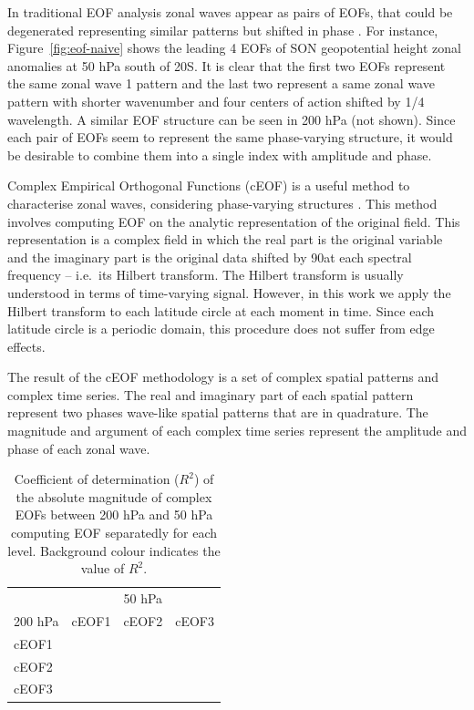 \documentclass[smallextended]{svjour3}       %
\begin{document}
In traditional EOF analysis zonal waves appear as pairs of EOFs, that could be degenerated representing similar patterns but shifted in phase \citep{horel1984}.
For instance, Figure~\ref{fig:eof-naive} shows the leading 4 EOFs of SON geopotential height zonal anomalies at 50 hPa south of 20\degree S.
It is clear that the first two EOFs represent the same zonal wave 1 pattern and the last two represent a same zonal wave pattern with shorter wavenumber and four centers of action shifted by 1/4 wavelength.
A similar EOF structure can be seen in 200 hPa (not shown).
Since each pair of EOFs seem to represent the same phase-varying structure, it would be desirable to combine them into a single index with amplitude and phase.

Complex Empirical Orthogonal Functions (cEOF) is a useful method to characterise zonal waves, considering phase-varying structures \citep{horel1984}.
This method involves computing EOF on the analytic representation of the original field.
This representation is a complex field in which the real part is the original variable and the imaginary part is the original data shifted by 90\degree at each spectral frequency -- i.e.~its Hilbert transform.
The Hilbert transform is usually understood in terms of time-varying signal.
However, in this work we apply the Hilbert transform to each latitude circle at each moment in time.
Since each latitude circle is a periodic domain, this procedure does not suffer from edge effects.

The result of the cEOF methodology is a set of complex spatial patterns and complex time series.
The real and imaginary part of each spatial pattern represent two phases wave-like spatial patterns that are in quadrature.
The magnitude and argument of each complex time series represent the amplitude and phase of each zonal wave.




\begin{table}

\caption{\label{tab:corr-ceof-splitted}Coefficient of determination (\(R^2\)) of the absolute magnitude of complex EOFs between 200 hPa and 50 hPa computing EOF separatedly for each level.
Background colour indicates the value of \(R^2\).}
\centering
\begin{tabular}[t]{l>{}r>{}r>{}r}
\toprule
\multicolumn{1}{c}{} & \multicolumn{3}{c}{50 hPa} \\
\cmidrule(l{3pt}r{3pt}){2-4}
200 hPa & cEOF1 & cEOF2 & cEOF3\\
\midrule
cEOF1 & \cellcolor[HTML]{E1C0BB}{\textcolor{black}{0.28}} & \cellcolor[HTML]{FDFCFC}{\textcolor{black}{0.01}} & \cellcolor[HTML]{FDFAFA}{\textcolor{black}{0.02}}\\
cEOF2 & \cellcolor[HTML]{FFFFFF}{\textcolor{black}{0.00}} & \cellcolor[HTML]{BB7A73}{\textcolor{white}{0.60}} & \cellcolor[HTML]{FDFAFA}{\textcolor{black}{0.02}}\\
cEOF3 & \cellcolor[HTML]{FFFFFF}{\textcolor{black}{0.00}} & \cellcolor[HTML]{FFFFFF}{\textcolor{black}{0.00}} & \cellcolor[HTML]{FDFAFA}{\textcolor{black}{0.02}}\\
\bottomrule
\end{tabular}
\end{table}
\end{document}
